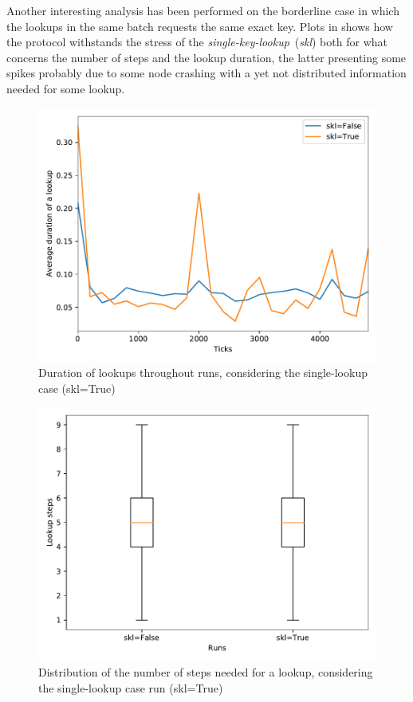 \documentclass[11pt,twocolumn,letterpaper]{article}
\begin{document}
	Another interesting analysis has been performed on the borderline case in which the lookups in the same batch requests the same exact key. Plots in  shows how the protocol withstands the stress of the \textit{single-key-lookup}~(\textit{skl}) both for what concerns the number of steps and the lookup duration, the latter presenting some spikes probably due to some node crashing with a yet not distributed information needed for some lookup.\\

	\begin{figure}[ht]
		\centering
		\includegraphics[width=\linewidth,clip,trim=0 0.5cm 0 0.35cm]{figures/analysis3/skl_lookupduration_time.pdf}
		\caption{Duration of lookups throughout runs, considering the single-lookup case (skl=True)}
		\label{fig:keys2}
	\end{figure}
	\begin{figure}[ht]
		\centering
		\includegraphics[width=\linewidth,clip,trim=0 0.5cm 0 0.35cm]{figures/analysis3/skl_lookuplength_box.pdf}
		\caption{Distribution of the number of steps needed for a lookup, considering the single-lookup case run (skl=True)}
		\label{fig:keys3}
	\end{figure}
	
\end{document}
